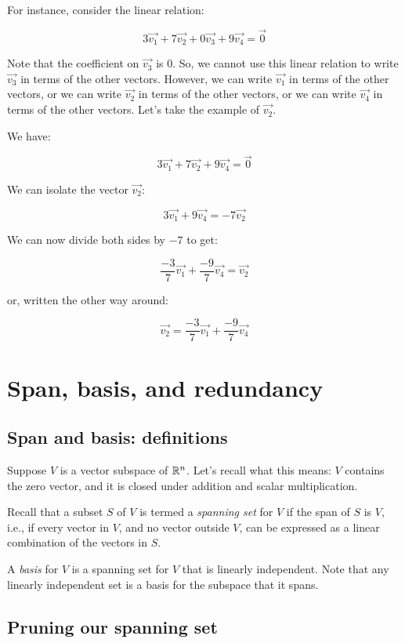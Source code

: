 \documentclass[10pt]{amsart}
\begin{document}
For instance, consider the linear relation:

$$3\vec{v_1} + 7\vec{v_2} + 0\vec{v_3} + 9\vec{v_4} = \vec{0}$$

Note that the coefficient on $\vec{v_3}$ is $0$. So, we cannot use
this linear relation to write $\vec{v_3}$ in terms of the other
vectors. However, we can write $\vec{v_1}$ in terms of the other
vectors, or we can write $\vec{v_2}$ in terms of the other vectors, or
we can write $\vec{v_4}$ in terms of the other vectors. Let's take the
example of $\vec{v_2}$.

We have:

$$3\vec{v_1} + 7\vec{v_2} + 9\vec{v_4} = \vec{0}$$

We can isolate the vector $\vec{v_2}$:

$$3\vec{v_1} + 9\vec{v_4} = -7\vec{v_2}$$

We can now divide both sides by $-7$ to get:

$$\frac{-3}{7} \vec{v_1} + \frac{-9}{7}\vec{v_4} = \vec{v_2}$$

or, written the other way around:

$$\vec{v_2} = \frac{-3}{7} \vec{v_1} + \frac{-9}{7}\vec{v_4}$$


\section{Span, basis, and redundancy}

\subsection{Span and basis: definitions}

Suppose $V$ is a vector subspace of $\mathbb{R}^n$. Let's recall what this
means: $V$ contains the zero vector, and it is closed under addition
and scalar multiplication.

Recall that a subset $S$ of $V$ is termed a {\em spanning set} for $V$
if the span of $S$ is $V$, i.e., if every vector in $V$, and no vector
outside $V$, can be expressed as a linear combination of the vectors
in $S$.

A {\em basis} for $V$ is a spanning set for $V$ that is linearly
independent. Note that any linearly independent set is a basis for the
subspace that it spans.

\subsection{Pruning our spanning set}
\end{document}
